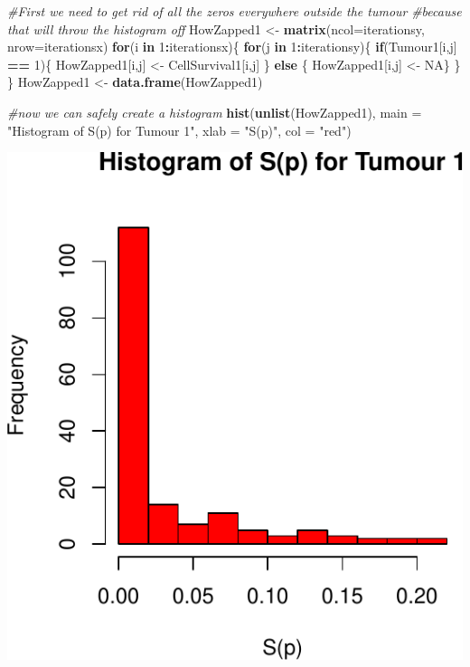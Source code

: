 \documentclass[]{article}
\newenvironment{Shaded}{\begin{snugshade}}{\end{snugshade}}
\newcommand{\KeywordTok}[1]{\textcolor[rgb]{0.13,0.29,0.53}{\textbf{#1}}}
\newcommand{\DataTypeTok}[1]{\textcolor[rgb]{0.13,0.29,0.53}{#1}}
\newcommand{\DecValTok}[1]{\textcolor[rgb]{0.00,0.00,0.81}{#1}}
\newcommand{\StringTok}[1]{\textcolor[rgb]{0.31,0.60,0.02}{#1}}
\newcommand{\CommentTok}[1]{\textcolor[rgb]{0.56,0.35,0.01}{\textit{#1}}}
\newcommand{\OtherTok}[1]{\textcolor[rgb]{0.56,0.35,0.01}{#1}}
\newcommand{\ControlFlowTok}[1]{\textcolor[rgb]{0.13,0.29,0.53}{\textbf{#1}}}
\newcommand{\OperatorTok}[1]{\textcolor[rgb]{0.81,0.36,0.00}{\textbf{#1}}}
\newcommand{\NormalTok}[1]{#1}
\begin{document}
\begin{Shaded}
\begin{Highlighting}[]
\CommentTok{#First we need to get rid of all the zeros everywhere outside the tumour}
\CommentTok{#because that will throw the histogram off}
\NormalTok{HowZapped1 <-}\StringTok{ }\KeywordTok{matrix}\NormalTok{(}\DataTypeTok{ncol=}\NormalTok{iterationsy, }\DataTypeTok{nrow=}\NormalTok{iterationsx)}
\ControlFlowTok{for}\NormalTok{(i }\ControlFlowTok{in} \DecValTok{1}\OperatorTok{:}\NormalTok{iterationsx)\{}
  \ControlFlowTok{for}\NormalTok{(j }\ControlFlowTok{in} \DecValTok{1}\OperatorTok{:}\NormalTok{iterationsy)\{}
    \ControlFlowTok{if}\NormalTok{(Tumour1[i,j] }\OperatorTok{==}\StringTok{ }\DecValTok{1}\NormalTok{)\{}
\NormalTok{      HowZapped1[i,j] <-}\StringTok{ }\NormalTok{CellSurvival1[i,j]}
\NormalTok{    \} }\ControlFlowTok{else}\NormalTok{ \{}
\NormalTok{      HowZapped1[i,j] <-}\StringTok{ }\OtherTok{NA}\NormalTok{\}}
\NormalTok{  \}}
\NormalTok{\}}
\NormalTok{HowZapped1 <-}\StringTok{ }\KeywordTok{data.frame}\NormalTok{(HowZapped1)}

\CommentTok{#now we can safely create a histogram}
\KeywordTok{hist}\NormalTok{(}\KeywordTok{unlist}\NormalTok{(HowZapped1), }\DataTypeTok{main =} \StringTok{"Histogram of S(p) for Tumour 1"}\NormalTok{, }\DataTypeTok{xlab =} \StringTok{"S(p)"}\NormalTok{, }\DataTypeTok{col =} \StringTok{"red"}\NormalTok{)}
\end{Highlighting}
\end{Shaded}

\begin{center}\includegraphics{TumourSurvival_files/figure-latex/unnamed-chunk-9-1} \end{center}
\end{document}
